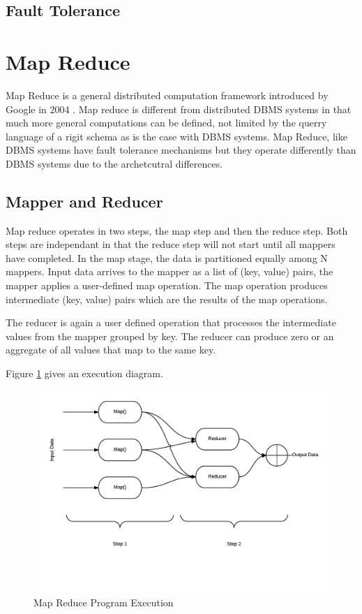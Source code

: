 \documentclass[10pt,twocolumn]{IEEEtran11}
\begin{document}
\subsection{Fault Tolerance}


\section {Map Reduce}

Map Reduce is a general distributed computation framework introduced by Google in 2004 \cite{dean2001mapreduce}.  Map reduce is different from distributed DBMS systems in that much more general computations can be defined, not limited by the querry language of a rigit schema as is the case with DBMS systems.  Map Reduce, like DBMS systems have fault tolerance mechanisms but they operate differently than DBMS systems due to the archetcutral differences. 

\subsection{Mapper and Reducer}
Map reduce operates in two steps, the map step and then the reduce step.  Both steps are independant in that the reduce step will not start until all mappers have completed.
In the map stage, the data is partitioned equally among N mappers.  Input data arrives to the mapper as a list of (key, value) pairs, the mapper applies a user-defined map operation.
The map operation produces intermediate (key, value) pairs which are the results of the map operations.  
\par
The reducer is again a user defined operation that processes the intermediate values from the mapper grouped by key.  The reducer can produce zero or an aggregate of all values
that map to the same key.

Figure \ref{fig:mapReduce} gives an execution diagram.
\begin{figure}[h]
\centering
\includegraphics[scale=0.12]{images/mapReduce.png}
\caption{Map Reduce Program Execution}
\label{fig:mapReduce}
\end{figure}
\end{document}

